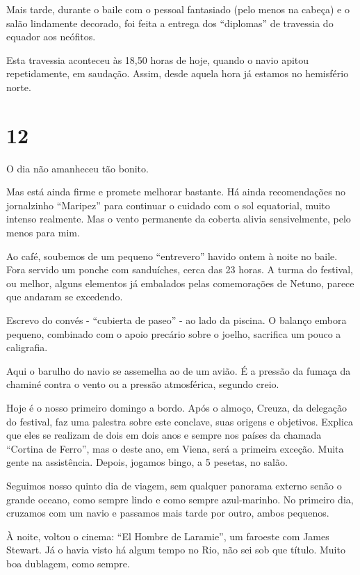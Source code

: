 Mais tarde, durante o baile com o pessoal fantasiado (pelo menos na cabeça) e o salão lindamente decorado, foi feita a entrega dos “diplomas” de travessia do equador aos neófitos.

Esta travessia aconteceu às 18,50 horas de hoje, quando o navio apitou repetidamente, em saudação. Assim, desde aquela hora já estamos no hemisfério norte.

\section*{12 \adfflatleafright {}}

O dia não amanheceu tão bonito.

Mas está ainda firme e promete melhorar bastante. Há ainda recomendações no jornalzinho “Maripez” para continuar o cuidado com o sol equatorial, muito intenso realmente. Mas o vento permanente da coberta alivia sensivelmente, pelo menos para mim.

Ao café, soubemos de um pequeno “entrevero” havido ontem à noite no baile. Fora servido um ponche com sanduíches, cerca das 23 horas. A turma do festival, ou melhor, alguns elementos já embalados pelas comemorações de Netuno, parece que andaram se excedendo.

Escrevo do convés - “cubierta de paseo” - ao lado da piscina. O balanço embora pequeno, combinado com o apoio precário sobre o joelho, sacrifica um pouco a caligrafia.

Aqui o barulho do navio se assemelha ao de um avião. É a pressão da fumaça da chaminé contra o vento ou a pressão atmosférica, segundo creio.

Hoje é o nosso primeiro domingo a bordo. Após o almoço, Creuza, da delegação do festival, faz uma palestra sobre este conclave, suas origens e objetivos. Explica que eles se realizam de dois em dois anos e sempre nos países da chamada “Cortina de Ferro”, mas o deste ano, em Viena, será a primeira exceção. Muita gente na assistência. Depois, jogamos bingo, a 5 pesetas, no salão.

Seguimos nosso quinto dia de viagem, sem qualquer panorama externo senão o grande oceano, como sempre lindo e como sempre azul-marinho. No primeiro dia, cruzamos com um navio e passamos mais tarde por outro, ambos pequenos.

À noite, voltou o cinema: “El Hombre de Laramie”, um faroeste com James Stewart. Já o havia visto há algum tempo no Rio, não sei sob que título. Muito boa dublagem, como sempre.

